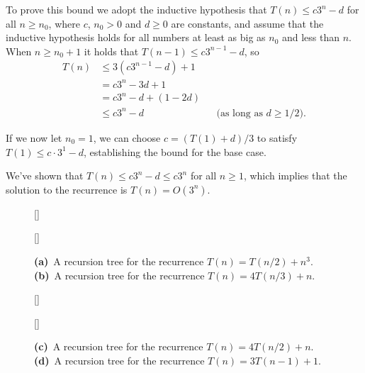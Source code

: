 To prove this bound we adopt the inductive hypothesis that $T(n)\le c3^n-d$ for all $n\ge n_0$, where $c$, $n_0>0$ and $d\ge0$ are constants, and assume that the inductive hypothesis holds for all numbers at least as big as $n_0$ and less than $n$.
When $n\ge n_0+1$ it holds that $T(n-1)\le c3^{n-1}-d$, so
\begin{align*}
    T(n) &\le 3(c3^{n-1}-d)+1 \\
    &= c3^n-3d+1 \\
    &= c3^n-d+(1-2d) \\
    &\le c3^n-d && \text{(as long as $d\ge1/2$)}.
\end{align*}

If we now let $n_0=1$, we can choose $c=(T(1)+d)/3$ to satisfy $T(1)\le c\cdot3^1-d$, establishing the bound for the base case.

We've shown that $T(n)\le c3^n-d\le c3^n$ for all $n\ge1$, which implies that the solution to the recurrence is $T(n)=O(3^n)$.

\begin{figure}[!htb]
    \subcaptionbox{\label{fig:4.4-1a}}[\textwidth]{}
    \par\vspace{10mm}
    \subcaptionbox{\label{fig:4.4-1b}}[\textwidth]{}
    \caption{
        \textbf{(a)}\, A recursion tree for the recurrence $T(n)=T(n/2)+n^3$.\,
        \textbf{(b)}\, A recursion tree for the recurrence $T(n)=4T(n/3)+n$.
    } \label{fig:4.4-1}
\end{figure}

\begin{figure}[htb!]\ContinuedFloat
    \subcaptionbox{\label{fig:4.4-1c}}[\textwidth]{}
    \par\vspace{10mm}
    \subcaptionbox{\label{fig:4.4-1d}}[\textwidth]{}
    \caption{
        \textbf{(c)}\, A recursion tree for the recurrence $T(n)=4T(n/2)+n$.\,
        \textbf{(d)}\, A recursion tree for the recurrence $T(n)=3T(n-1)+1$.
    }
\end{figure}
